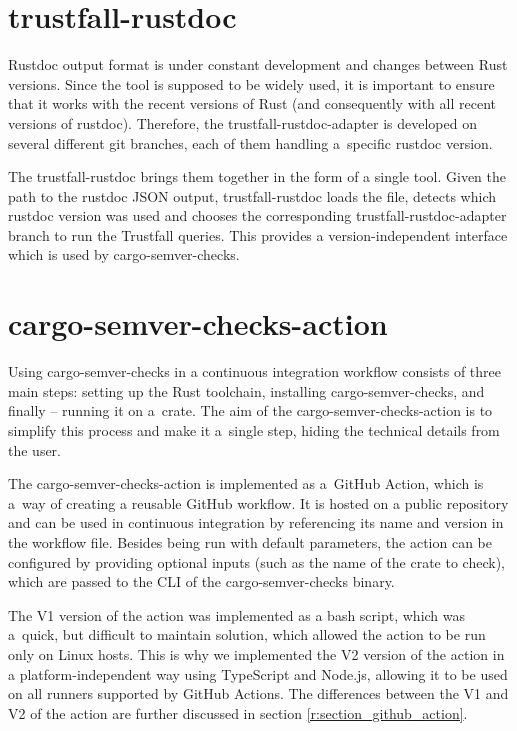 \documentclass[licencjacka,en]{pracamgr}
\begin{document}
\section{trustfall-rustdoc}\label{r:section_trustfall_rustdoc}

Rustdoc output format is under constant development and changes between Rust versions.
Since the tool is supposed to be widely used, it is important to ensure that it works with
the recent versions of Rust (and consequently with all recent versions of rustdoc).
Therefore, the trustfall-rustdoc-adapter is developed on several different git branches,
each of them handling a~specific rustdoc version.

The trustfall-rustdoc brings them together in the form of a single tool. Given the path to
the rustdoc JSON output, trustfall-rustdoc loads the file, detects which rustdoc version was used
and chooses the corresponding trustfall-rustdoc-adapter branch to run the Trustfall queries.
This provides a version-independent interface which is used by cargo-semver-checks.

\section{cargo-semver-checks-action}\label{r:section_cargo_semver_checks_action}

Using cargo-semver-checks in a continuous integration workflow consists of three main steps:
setting up the Rust toolchain, installing cargo-semver-checks, and finally -- running it on a~crate.
The aim of the cargo-semver-checks-action is to simplify this process and make it a~single step,
hiding the technical details from the user.

The cargo-semver-checks-action is implemented as a~GitHub Action, which is a~way of creating
a reusable GitHub workflow. It is hosted on a public repository and can be used in continuous
integration by referencing its name and version in the workflow file. Besides being run with default
parameters, the action can be configured by providing optional inputs (such as the name of the crate
to check), which are passed to the CLI of the cargo-semver-checks binary.

The V1 version of the action was implemented as a bash script, which was a~quick, but difficult
to maintain solution, which allowed the action to be run only on Linux hosts. This is why
we implemented the V2 version of the action in a platform-independent way using TypeScript
and Node.js, allowing it to be used on all runners supported by GitHub Actions.
The differences between the V1 and V2 of the action are further discussed in section
\ref{r:section_github_action}.
\end{document}
